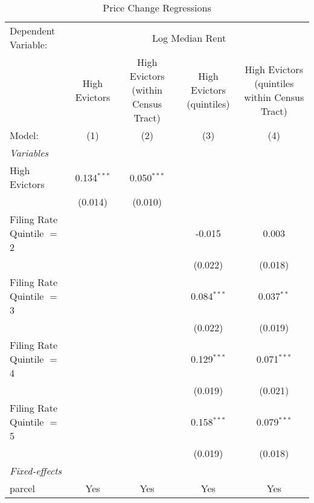 \begin{table}[htbp]
   \caption{Price Change Regressions}
   \centering
   \begin{tabular}{lcccc}
      \tabularnewline \midrule \midrule
      Dependent Variable: & \multicolumn{4}{c}{Log Median Rent}\\
                                 & High Evictors & High Evictors (within Census Tract) & High Evictors (quintiles) & High Evictors (quintiles within Census Tract) \\   
      Model:                     & (1)           & (2)                                 & (3)                       & (4)\\  
      \midrule
      \emph{Variables}\\
      High Evictors              & 0.134$^{***}$ & 0.050$^{***}$                       &                           &   \\   
                                 & (0.014)       & (0.010)                             &                           &   \\   
      Filing Rate Quintile $=$ 2 &               &                                     & -0.015                    & 0.003\\   
                                 &               &                                     & (0.022)                   & (0.018)\\   
      Filing Rate Quintile $=$ 3 &               &                                     & 0.084$^{***}$             & 0.037$^{**}$\\   
                                 &               &                                     & (0.022)                   & (0.019)\\   
      Filing Rate Quintile $=$ 4 &               &                                     & 0.129$^{***}$             & 0.071$^{***}$\\   
                                 &               &                                     & (0.019)                   & (0.021)\\   
      Filing Rate Quintile $=$ 5 &               &                                     & 0.158$^{***}$             & 0.079$^{***}$\\   
                                 &               &                                     & (0.019)                   & (0.018)\\   
      \midrule
      \emph{Fixed-effects}\\
      parcel                     & Yes           & Yes                                 & Yes                       & Yes\\  

\end{tabular}
\end{table}
